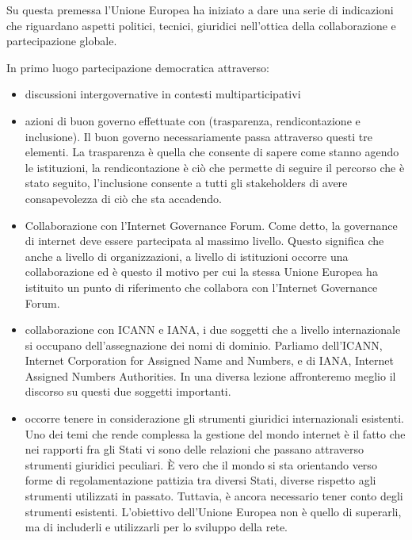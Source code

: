 Su questa premessa l'Unione Europea ha iniziato a dare una serie di indicazioni che riguardano aspetti politici, tecnici, giuridici nell'ottica della collaborazione e partecipazione globale.

In primo luogo partecipazione democratica attraverso:
\begin{itemize}
    \item discussioni intergovernative in contesti multiparticipativi
    
    \item  azioni di buon governo effettuate con (trasparenza, rendicontazione e inclusione). Il buon governo necessariamente passa attraverso questi tre elementi. La trasparenza è quella che consente di sapere come stanno agendo le istituzioni, la rendicontazione è ciò che permette di seguire il percorso che è stato seguito, l'inclusione consente a tutti gli stakeholders di avere consapevolezza di ciò che sta accadendo.
    
    \item Collaborazione con l'Internet Governance Forum. Come detto, la governance di internet deve essere partecipata al massimo livello. Questo significa che anche a livello di organizzazioni, a livello di istituzioni occorre una collaborazione ed è questo il motivo per cui la stessa Unione Europea ha istituito un punto di riferimento che collabora con l'Internet Governance Forum.
    
    \item collaborazione con ICANN e IANA, i due soggetti che a livello internazionale si occupano dell'assegnazione dei nomi di dominio. Parliamo dell'ICANN, Internet Corporation for Assigned Name and Numbers, e di IANA, Internet Assigned Numbers Authorities. In una diversa lezione affronteremo meglio il discorso su questi due soggetti importanti.
    
    \item occorre tenere in considerazione gli strumenti giuridici internazionali esistenti. Uno dei temi che rende complessa la gestione del mondo internet è il fatto che nei rapporti fra gli Stati vi sono delle relazioni che passano attraverso strumenti giuridici peculiari. È vero che il mondo si sta orientando verso forme di regolamentazione pattizia tra diversi Stati, diverse rispetto agli strumenti utilizzati in passato. Tuttavia, è ancora necessario tener conto degli strumenti esistenti. L’obiettivo dell’Unione Europea non è quello di superarli, ma di includerli e utilizzarli per lo sviluppo della rete.
\end{itemize}


